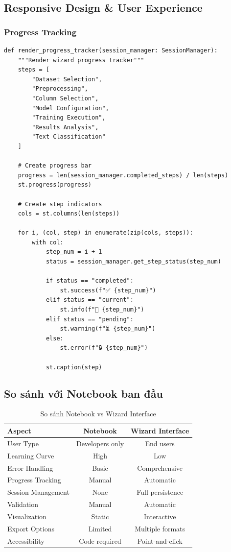 \subsection{Responsive Design \& User Experience}

\subsubsection{Progress Tracking}

\begin{verbatim}
def render_progress_tracker(session_manager: SessionManager):
    """Render wizard progress tracker"""
    steps = [
        "Dataset Selection",
        "Preprocessing",
        "Column Selection", 
        "Model Configuration",
        "Training Execution",
        "Results Analysis",
        "Text Classification"
    ]
    
    # Create progress bar
    progress = len(session_manager.completed_steps) / len(steps)
    st.progress(progress)
    
    # Create step indicators
    cols = st.columns(len(steps))
    
    for i, (col, step) in enumerate(zip(cols, steps)):
        with col:
            step_num = i + 1
            status = session_manager.get_step_status(step_num)
            
            if status == "completed":
                st.success(f"✅ {step_num}")
            elif status == "current":
                st.info(f"🔄 {step_num}")
            elif status == "pending":
                st.warning(f"⏳ {step_num}")
            else:
                st.error(f"🔒 {step_num}")
            
            st.caption(step)
\end{verbatim}

\subsection{So sánh với Notebook ban đầu}

\begin{table}[H]
\centering
\begin{tabular}{|l|c|c|}
\hline
\textbf{Aspect} & \textbf{Notebook} & \textbf{Wizard Interface} \\
\hline
User Type & Developers only & End users \\
\hline
Learning Curve & High & Low \\
\hline
Error Handling & Basic & Comprehensive \\
\hline
Progress Tracking & Manual & Automatic \\
\hline
Session Management & None & Full persistence \\
\hline
Validation & Manual & Automatic \\
\hline
Visualization & Static & Interactive \\
\hline
Export Options & Limited & Multiple formats \\
\hline
Accessibility & Code required & Point-and-click \\
\hline
\end{tabular}
\caption{So sánh Notebook vs Wizard Interface}
\end{table}

